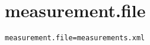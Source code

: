 \section{measurement.file}
\label{configuration:MeasurementFile}
\ClearAPI
\TODO
\begin{lstlisting}[style=Props,caption={Usage example for \textit{measurement.file}}]
measurement.file=measurements.xml
\end{lstlisting}